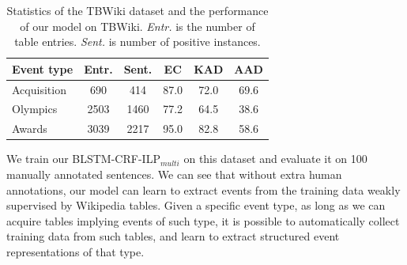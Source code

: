 \begin{table}[h]
\small
\centering
\begin{tabular}{|l|c|c|c|c|c|} \hline
	Event type & Entr. & Sent. & EC & KAD & AAD \\ \hline
	Acquisition & 690 & 414 & 87.0 & 72.0 & 69.6 \\ \hline
	Olympics & 2503 & 1460 & 77.2 & 64.5 & 38.6 \\ \hline
	Awards & 3039 & 2217 & 95.0 & 82.8 & 58.6 \\ \hline
\end{tabular}
\caption{Statistics of the TBWiki dataset and the performance of our model on TBWiki. \textit{Entr.} is the number of table entries. \textit{Sent.} is number of positive instances.\label{tab:6}}
\end{table}

We train our BLSTM-CRF-ILP$_{multi}$ on this dataset and evaluate it on 100 manually annotated sentences.
We can see that without extra human annotations, %
our model can learn to extract events from the training data weakly supervised by Wikipedia tables. Given a specific event type, as long as we can acquire tables implying events of such type, it is possible to automatically collect training data from such tables, and learn to extract structured event representations of that type. %
